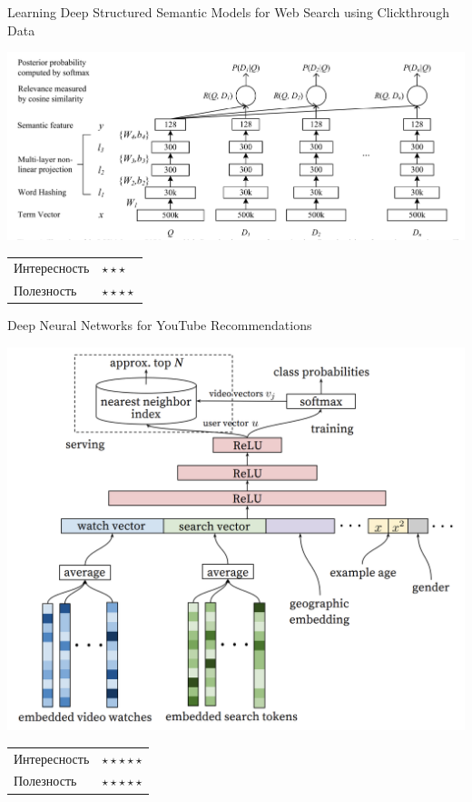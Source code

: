 \documentclass[11pt,aspectratio=169]{beamer}
\begin{document}
\begin{frame}{Learning Deep Structured Semantic Models for Web Search using Clickthrough Data \cite{DSSM}}

\begin{center}
\includegraphics[scale=0.35]{images/dssm.png}
\end{center}

\begin{tabular}{l l}
Интересность & $\star\star\star$ \\
Полезность & $\star\star\star\star$
\end{tabular}

\end{frame}

\begin{frame}{Deep Neural Networks for YouTube Recommendations \cite{YTBE}}

\begin{center}
\includegraphics[scale=0.25]{images/youtube-candidate.png}
\end{center}

\begin{tabular}{l l}
Интересность & $\star\star\star\star\star$ \\
Полезность & $\star\star\star\star\star$
\end{tabular}

\end{frame}
\end{document}
